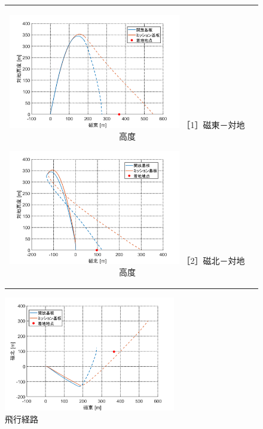 \documentclass[a4paper,11pt,titlepage,uplatex]{jsarticle}
\begin{document}
\begin{figure}[H]
    \begin{tabular}{cc}
        \begin{minipage}{.48\textwidth}
            \centering
            \includegraphics[width=75mm]{pic_sim/pos2_eh.png}
            \hspace{16mm} {\small［1］磁東－対地高度}
        \end{minipage}
        \begin{minipage}{.48\textwidth}
            \centering
            \includegraphics[width=75mm]{pic_sim/pos2_nh.png}
            \hspace{16mm} {\small［2］磁北－対地高度}
        \end{minipage}
    \end{tabular}
    \centering
    \begin{minipage}{.48\textwidth}
        \centering
        \includegraphics[width=75mm]{pic_sim/pos2_en.png}
        \hspace{16mm}{\small［3］磁東－磁北}
    \end{minipage}
    \caption{飛行経路}
    \label{fig:hikoukeiro}
\end{figure}
\end{document}
